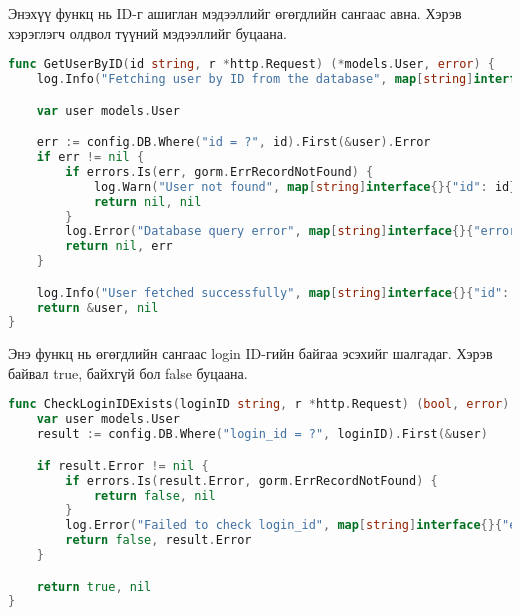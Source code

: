 Энэхүү функц нь ID-г ашиглан мэдээллийг өгөгдлийн сангаас авна. Хэрэв хэрэглэгч олдвол түүний мэдээллийг буцаана.
\begin{lstlisting}[language=Go, caption=Get User By ID Service, frame=single]
func GetUserByID(id string, r *http.Request) (*models.User, error) {
	log.Info("Fetching user by ID from the database", map[string]interface{}{"id": id}, r)

	var user models.User

	err := config.DB.Where("id = ?", id).First(&user).Error
	if err != nil {
		if errors.Is(err, gorm.ErrRecordNotFound) {
			log.Warn("User not found", map[string]interface{}{"id": id}, r)
			return nil, nil
		}
		log.Error("Database query error", map[string]interface{}{"error": err.Error()}, r)
		return nil, err
	}

	log.Info("User fetched successfully", map[string]interface{}{"id": id}, r)
	return &user, nil
}
\end{lstlisting}

Энэ функц нь өгөгдлийн сангаас login ID-гийн байгаа эсэхийг шалгадаг. Хэрэв байвал true, байхгүй бол false буцаана.
\begin{lstlisting}[language=Go, caption=Check if login ID exists Service, frame=single]
func CheckLoginIDExists(loginID string, r *http.Request) (bool, error) {
	var user models.User
	result := config.DB.Where("login_id = ?", loginID).First(&user)

	if result.Error != nil {
		if errors.Is(result.Error, gorm.ErrRecordNotFound) {
			return false, nil
		}
		log.Error("Failed to check login_id", map[string]interface{}{"error": result.Error.Error()}, r)
		return false, result.Error 
	}

	return true, nil 
}
\end{lstlisting}
\pagebreak
